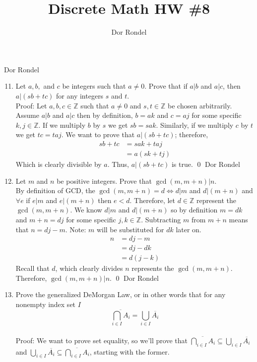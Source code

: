 \documentclass{article}
\title{Discrete Math HW \#8}
\author{Dor Rondel}
\begin{document}
\maketitle
\newpage
Dor Rondel \\
\begin{enumerate}
  \setcounter{enumi}{10}
  \item Let $a, b,$ and $c$ be integers such that $a \ne 0$. Prove that if $a|b$ and $a|c$, then $a|(sb+tc)$ for any integers $s$ and $t$. \\
\newline
Proof: Let $a, b, c \in \mathbb{Z}$ such that $a \ne 0$ and $s, t \in \mathbb{Z}$ be chosen arbitrarily. Assume $a|b$ and $a|c$ then by definition, $b = ak$ and $c = aj$ for some specific $k, j \in \mathbb{Z}$. If we multiply $b$ by $s$ we get $sb = sak$. Similarly, if we multiply $c$ by $t$ we get $tc = taj$. We want to prove that $a|(sb+tc)$; therefore,
\begin{align*}
sb + tc &= sak + taj \\
        &= a(sk + tj)
\end{align*}
Which is clearly divisible by $a$. Thus, $a|(sb+tc)$ is true. \qed
\newpage
Dor Rondel \\
  \item Let $m$ and $n$ be positive integers. Prove that $\gcd(m, m+n) | n$.\\ 
  \newline
  By definition of GCD, the $\gcd(m, m+n)=d \iff d|m$ and $d|(m+n)$ and $\forall e$ if $e|m$ and $e|(m+n)$ then $e<d$. Therefore, let $d \in \mathbb{Z}$ represent the $\gcd(m, m+n)$. We know $d|m$ and $d|(m+n)$ so by definition $m = dk$ and $m+n= dj$ for some specific $j,k \in \mathbb{Z}$. Subtracting $m$ from $m+n$ means that $n=dj-m$. Note: $m$ will be substituted for $dk$ later on.
\begin{align*}
n &= dj - m \\
  &= dj - dk \\
  &= d(j-k) 
\end{align*}
Recall that $d$, which clearly divides $n$ represents the $\gcd(m, m+n)$. Therefore, $\gcd(m, m+n)|n$. \qed
\newpage
Dor Rondel \\
  \item Prove the generalized DeMorgan Law, or in other words that for any nonempty index set $I$
$$\overline{\bigcap_{i \in I} A_i} = \bigcup_{i\in I} \overline{A_i}$$ \\
  \newline
  Proof: We want to prove set equality, so we'll prove that $\overline{\bigcap_{i \in I} A_i} \subseteq \bigcup_{i\in I} \overline{A_i}$ and $\bigcup_{i\in I} \overline{A_i} \subseteq \overline{\bigcap_{i \in I} A_i}$, starting with the former. \\

\end{enumerate}
\end{document}
